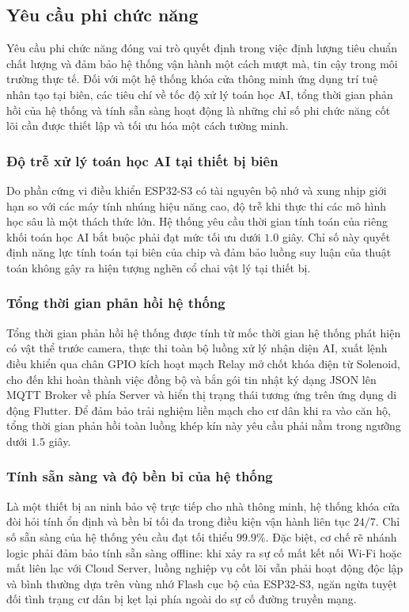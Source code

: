 \subsection{Yêu cầu phi chức năng}
Yêu cầu phi chức năng đóng vai trò quyết định trong việc định lượng tiêu chuẩn chất lượng và đảm bảo hệ thống vận hành một cách mượt mà, tin cậy trong môi trường thực tế. Đối với một hệ thống khóa cửa thông minh ứng dụng trí tuệ nhân tạo tại biên, các tiêu chí về tốc độ xử lý toán học AI, tổng thời gian phản hồi của hệ thống và tính sẵn sàng hoạt động là những chỉ số phi chức năng cốt lõi cần được thiết lập và tối ưu hóa một cách tường minh.

\subsubsection{Độ trễ xử lý toán học AI tại thiết bị biên}
Do phần cứng vi điều khiển ESP32-S3 có tài nguyên bộ nhớ và xung nhịp giới hạn so với các máy tính nhúng hiệu năng cao, độ trễ khi thực thi các mô hình học sâu là một thách thức lớn. Hệ thống yêu cầu thời gian tính toán của riêng khối toán học AI bắt buộc phải đạt mức tối ưu dưới $1.0$ giây. Chỉ số này quyết định năng lực tính toán tại biên của chip và đảm bảo luồng suy luận của thuật toán không gây ra hiện tượng nghẽn cổ chai vật lý tại thiết bị.

\subsubsection{Tổng thời gian phản hồi hệ thống}
Tổng thời gian phản hồi hệ thống được tính từ mốc thời gian hệ thống phát hiện có vật thể trước camera, thực thi toàn bộ luồng xử lý nhận diện AI, xuất lệnh điều khiển qua chân GPIO kích hoạt mạch Relay mở chốt khóa điện từ Solenoid, cho đến khi hoàn thành việc đồng bộ và bắn gói tin nhật ký dạng JSON lên MQTT Broker về phía Server và hiển thị trạng thái tương ứng trên ứng dụng di động Flutter. Để đảm bảo trải nghiệm liền mạch cho cư dân khi ra vào căn hộ, tổng thời gian phản hồi toàn luồng khép kín này yêu cầu phải nằm trong ngưỡng dưới $1.5$ giây.

\subsubsection{Tính sẵn sàng và độ bền bỉ của hệ thống}
Là một thiết bị an ninh bảo vệ trực tiếp cho nhà thông minh, hệ thống khóa cửa đòi hỏi tính ổn định và bền bỉ tối đa trong điều kiện vận hành liên tục $24/7$. Chỉ số sẵn sàng của hệ thống yêu cầu đạt tối thiểu $99.9\%$. Đặc biệt, cơ chế rẽ nhánh logic phải đảm bảo tính sẵn sàng offline: khi xảy ra sự cố mất kết nối Wi-Fi hoặc mất liên lạc với Cloud Server, luồng nghiệp vụ cốt lõi vẫn phải hoạt động độc lập và bình thường dựa trên vùng nhớ Flash cục bộ của ESP32-S3, ngăn ngừa tuyệt đối tình trạng cư dân bị kẹt lại phía ngoài do sự cố đường truyền mạng.

